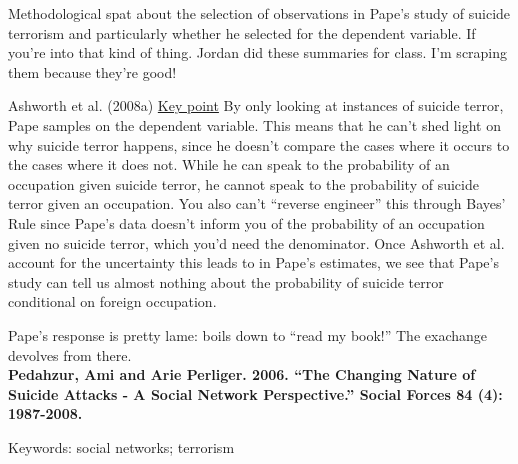 \documentclass{article}[12pt]
\begin{document}
Methodological spat about the selection of observations in Pape's study of suicide terrorism and particularly whether he selected for the dependent variable. If you're into that kind of thing. Jordan did these summaries for class. I'm scraping them because they're good!

Ashworth et al. (2008a)
\underline{Key point} By only looking at instances of suicide terror, Pape samples on the dependent variable.
This means that he can’t shed light on why suicide terror happens, since he doesn’t compare the cases where it occurs to the cases where it does not. While he can speak to the probability of an occupation given suicide terror, he cannot speak to the probability of suicide terror given an occupation. You also can’t “reverse engineer” this through Bayes’ Rule since Pape’s data doesn’t inform you of the probability of an occupation given no suicide terror, which you’d need the denominator. Once Ashworth et al. account for the uncertainty this leads to in Pape’s estimates, we see that Pape’s study can tell us almost nothing about the probability of suicide terror conditional on foreign occupation.

Pape's response is pretty lame: boils down to ``read my book!'' The exachange devolves from there.\\

\textbf{Pedahzur, Ami and Arie Perliger. 2006. “The Changing Nature of Suicide Attacks - A Social Network Perspective.” Social Forces 84 (4): 1987-2008.}

Keywords: social networks; terrorism\\
\end{document}
